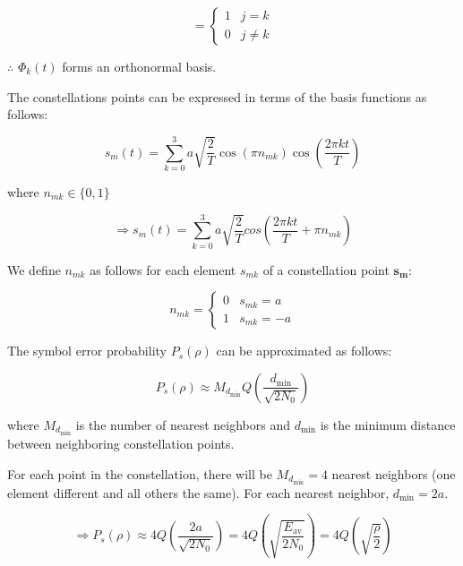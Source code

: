 \documentclass[fleqn]{article}
\begin{document}
\begin{enumerate}
		\begin{equation*}
			= \begin{cases}
				1 & j = k \\
				0 & j \neq k
			\end{cases}
		\end{equation*}
		
		$\therefore$ $\Phi_k(t)$ forms an orthonormal basis.
		
		The constellations points can be expressed in terms of the basis functions as follows:
		
		\begin{equation*}
			s_m(t) = \sum_{k=0}^{3}{a\sqrt{\frac{2}{T}}\cos({\pi}n_{mk})\cos\left(\frac{2{\pi}kt}{T}\right)}
		\end{equation*}
		
		where $n_{mk} \in \{0, 1\}$
		
		\begin{equation*}
			\Rightarrow s_m(t) = \sum_{k=0}^{3}{a\sqrt{\frac{2}{T}}cos\left(\frac{2{\pi}kt}{T}+{\pi}n_{mk}\right)}
		\end{equation*}
		
		We define $n_{mk}$ as follows for each element $s_{mk}$ of a constellation point $\mathbf{s_m}$:
		
		\begin{equation*}
			n_{mk} = \begin{cases}
				0 & s_{mk} = a\\
				1 & s_{mk} = -a
			\end{cases}
		\end{equation*}
		
		The symbol error probability $P_s(\rho)$ can be approximated as follows:
		
		\begin{equation*}
			P_s(\rho) \approx M_{d_\text{min}}Q\left(\frac{d_\text{min}}{\sqrt{2N_0}}\right)
		\end{equation*}
		
		where $M_{d_\text{min}}$ is the number of nearest neighbors and $d_\text{min}$ is the minimum distance between neighboring constellation points.
		
		For each point in the constellation, there will be $M_{d_\text{min}} = 4$ nearest neighbors (one element different and all others the same). For each nearest neighbor, $d_\text{min} = 2a$.
		
		\begin{equation*}
			\Rightarrow P_s(\rho) \approx 4Q\left(\frac{2a}{\sqrt{2N_0}}\right) = 4Q\left(\sqrt{\frac{E_\text{av}}{2N_0}}\right)= 4Q\left(\sqrt{\frac{\rho}{2}}\right)
		\end{equation*}
		

\end{enumerate}
\end{document}
